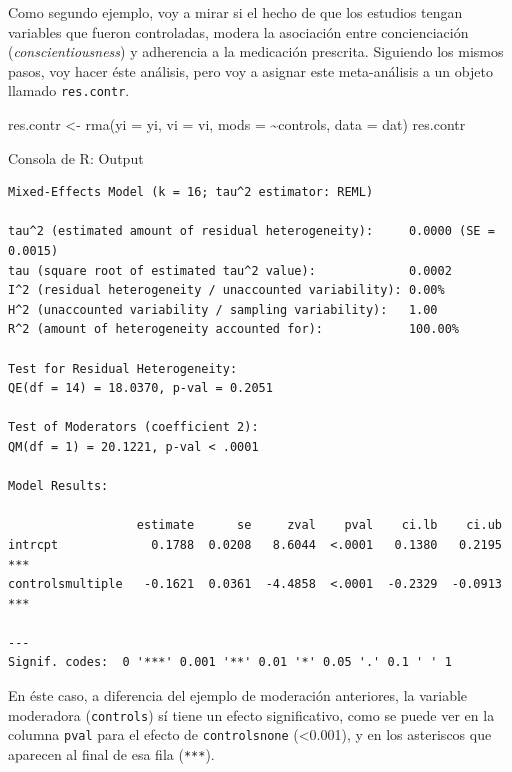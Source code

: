\documentclass[
  bookmarksnumbered]{article}
\newenvironment{Shaded}{\begin{snugshade}}{\end{snugshade}}
\newcommand{\AttributeTok}[1]{\textcolor[rgb]{0.00,0.34,0.68}{#1}}
\newcommand{\FunctionTok}[1]{\textcolor[rgb]{0.39,0.29,0.61}{#1}}
\newcommand{\NormalTok}[1]{\textcolor[rgb]{0.12,0.11,0.11}{#1}}
\newcommand{\OtherTok}[1]{\textcolor[rgb]{0.00,0.43,0.16}{#1}}
\newcommand{\SpecialCharTok}[1]{\textcolor[rgb]{0.24,0.68,0.91}{#1}}
\begin{document}
Como segundo ejemplo, voy a mirar si el hecho de que los estudios tengan variables que fueron controladas, modera la asociación entre concienciación (\emph{conscientiousness}) y adherencia a la medicación prescrita. Siguiendo los mismos pasos, voy hacer éste análisis, pero voy a asignar este meta-análisis a un objeto llamado \texttt{res.contr}.

\begin{Shaded}
\begin{Highlighting}[]
\NormalTok{res.contr }\OtherTok{\textless{}{-}} \FunctionTok{rma}\NormalTok{(}\AttributeTok{yi =}\NormalTok{ yi, }\AttributeTok{vi =}\NormalTok{ vi, }\AttributeTok{mods =} \SpecialCharTok{\textasciitilde{}}\NormalTok{controls, }\AttributeTok{data =}\NormalTok{ dat)}
\NormalTok{res.contr}
\end{Highlighting}
\end{Shaded}

\begin{ROut}{Consola de R: Output~\thetcbcounter}
                \begin{footnotesize}
                \begin{verbatim} 
Mixed-Effects Model (k = 16; tau^2 estimator: REML)

tau^2 (estimated amount of residual heterogeneity):     0.0000 (SE = 0.0015)
tau (square root of estimated tau^2 value):             0.0002
I^2 (residual heterogeneity / unaccounted variability): 0.00%
H^2 (unaccounted variability / sampling variability):   1.00
R^2 (amount of heterogeneity accounted for):            100.00%

Test for Residual Heterogeneity:
QE(df = 14) = 18.0370, p-val = 0.2051

Test of Moderators (coefficient 2):
QM(df = 1) = 20.1221, p-val < .0001

Model Results:

                  estimate      se     zval    pval    ci.lb    ci.ub      
intrcpt             0.1788  0.0208   8.6044  <.0001   0.1380   0.2195  *** 
controlsmultiple   -0.1621  0.0361  -4.4858  <.0001  -0.2329  -0.0913  *** 

---
Signif. codes:  0 '***' 0.001 '**' 0.01 '*' 0.05 '.' 0.1 ' ' 1
 \end{verbatim}
                \end{footnotesize}
                \end{ROut}

En éste caso, a diferencia del ejemplo de moderación anteriores, la variable moderadora (\texttt{controls}) sí tiene un efecto significativo, como se puede ver en la columna \texttt{pval} para el efecto de \texttt{controlsnone} (\textless0.001), y en los asteriscos que aparecen al final de esa fila (\texttt{***}).
\end{document}
